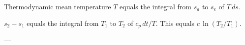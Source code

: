 Thermodynamic mean temperature \( T \) equals the integral from \( s_a \) to \( s_e \) of \( T \, ds \).  

\( s_2 - s_1 \) equals the integral from \( T_1 \) to \( T_2 \) of \( c_p \, dt / T \).  
This equals \( c \, \ln(T_2 / T_1) \).  

---